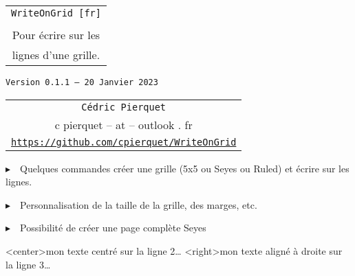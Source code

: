 \documentclass[a4paper]{article}
\def\TPversion{0.1.1}
\def\TPdate{20 Janvier 2023}
\begin{document}
\pagestyle{fancy}

\thispagestyle{empty}

\vspace{2cm}

\begin{center}
	\begin{minipage}{0.75\linewidth}
	\begin{tcolorbox}[colframe=yellow,colback=yellow!15]
		\begin{center}
			\begin{tabular}{c}
				{\Huge \texttt{WriteOnGrid [fr]}}\\
				\\
				{\LARGE Pour écrire sur les} \\
				{\LARGE lignes d'une grille.}
			\end{tabular}
			
			\medskip
			
			{\small \texttt{Version \TPversion{} -- \TPdate}}
		\end{center}
	\end{tcolorbox}
\end{minipage}
\end{center}

\vspace{0.5cm}

\begin{center}
	\begin{tabular}{c}
	\texttt{Cédric Pierquet}\\
	{\ttfamily c pierquet -- at -- outlook . fr}\\
	\texttt{\url{https://github.com/cpierquet/WriteOnGrid}}
\end{tabular}
\end{center}

\vspace{0.5cm}

{$\blacktriangleright$~~Quelques commandes créer une grille (5x5 ou Seyes ou Ruled) et écrire \og sur \fg{} les lignes.}

\smallskip

{$\blacktriangleright$~~Personnalisation de la taille de la grille, des marges, etc.}

\smallskip

{$\blacktriangleright$~~Possibilité de créer une page complète Seyes}

\vspace{1cm}

\begin{center}
	\begin{EnvQuadrillage}[NbCarreaux=22x8]
	\EcrireLigne<center>{mon texte centré sur la ligne 2\ldots}
	\EcrireLigne<right>{mon texte aligné à droite sur la ligne 3\ldots}
	\PasseLigne
\end{EnvQuadrillage}
\end{center}
\end{document}
